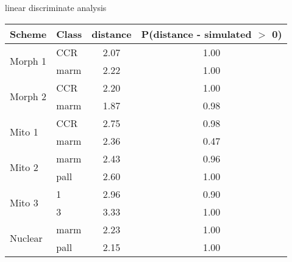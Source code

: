 \begin{subtable}[b]{0.3\textwidth}
  \caption{linear discriminate analysis}
  \centering
  \begin{tabular}{ l | l c c }
    \hline
    Scheme & Class & distance & P(distance - simulated \(>\) 0)\\ 
    \hline
    \hline
    \multirow{2}{*}{Morph 1} & CCR & 2.07 & 1.00 \\ 
    & marm & 2.22 & 1.00 \\ 
    \hline
    \multirow{2}{*}{Morph 2} & CCR & 2.20 & 1.00 \\ 
    & marm & 1.87 & 0.98 \\ 
    \hline
    \multirow{2}{*}{Mito 1} & CCR & 2.75 & 0.98 \\ 
    & marm & 2.36 & 0.47 \\ 
    \hline
    \multirow{2}{*}{Mito 2} & marm & 2.43 & 0.96 \\ 
    & pall & 2.60 & 1.00 \\ 
    \hline
    \multirow{2}{*}{Mito 3} & 1 & 2.96 & 0.90 \\ 
    & 3 & 3.33 & 1.00 \\ 
    \hline
    \multirow{2}{*}{Nuclear} & marm & 2.23 & 1.00 \\ 
    & pall & 2.15 & 1.00 \\ 
    \hline
  \end{tabular}
  \label{llmiss}
\end{subtable}
